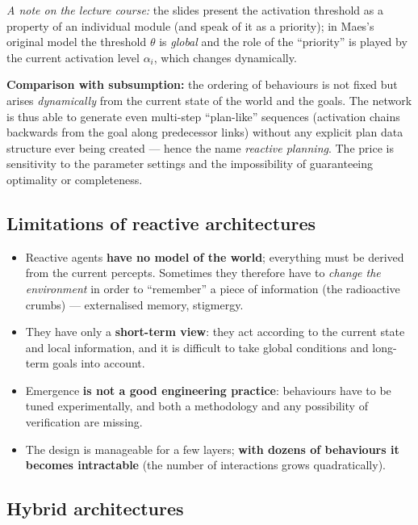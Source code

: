 \documentclass[11pt,a4paper]{article}
\theoremstyle{definition}
\providecommand{\uv}[1]{``#1''}
\begin{document}
\emph{A note on the lecture course:} the slides present the activation threshold as a property of an
individual module (and speak of it as a priority); in Maes's original model the threshold $\theta$ is
\emph{global} and the role of the \uv{priority} is played by the current activation level
$\alpha_i$, which changes dynamically.

\medskip\noindent
\textbf{Comparison with subsumption:} the ordering of behaviours is not fixed but arises
\emph{dynamically} from the current state of the world and the goals. The network is thus able to
generate even multi-step \uv{plan-like} sequences (activation chains backwards from the goal along
predecessor links) without any explicit plan data structure ever being created --- hence the name
\emph{reactive planning}. The price is sensitivity to the parameter settings and the impossibility of
guaranteeing optimality or completeness.

\subsection{Limitations of reactive architectures}

\begin{itemize}
\item Reactive agents \textbf{have no model of the world}; everything must be derived from the
  current percepts. Sometimes they therefore have to \emph{change the environment} in order to
  \uv{remember} a piece of information (the radioactive crumbs) --- externalised memory, stigmergy.
\item They have only a \textbf{short-term view}: they act according to the current state and local
  information, and it is difficult to take global conditions and long-term goals into account.
\item Emergence \textbf{is not a good engineering practice}: behaviours have to be tuned
  experimentally, and both a methodology and any possibility of verification are missing.
\item The design is manageable for a few layers; \textbf{with dozens of behaviours it becomes
  intractable} (the number of interactions grows quadratically).
\end{itemize}

\subsection{Hybrid architectures}
\label{ssec:hybridni}
\end{document}
